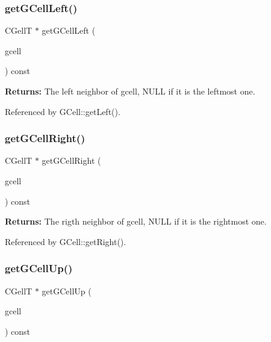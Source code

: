 \subsubsection{\texorpdfstring{get\+G\+Cell\+Left()}{getGCellLeft()}}
{\footnotesize\ttfamily C\+GellT $\ast$ get\+G\+Cell\+Left (\begin{DoxyParamCaption}\item[{const G\+CellT $\ast$}]{gcell }\end{DoxyParamCaption}) const\hspace{0.3cm}{\ttfamily [inline]}}

{\bfseries Returns\+:} The left neighbor of {\ttfamily gcell}, {\ttfamily N\+U\+LL} if it is the leftmost one. 

Referenced by G\+Cell\+::get\+Left().

\mbox{\label{classKatabatic_1_1Grid_a0e9bba0feb437dca932d59703298358e}} 
\subsubsection{\texorpdfstring{get\+G\+Cell\+Right()}{getGCellRight()}}
{\footnotesize\ttfamily C\+GellT $\ast$ get\+G\+Cell\+Right (\begin{DoxyParamCaption}\item[{const G\+CellT $\ast$}]{gcell }\end{DoxyParamCaption}) const\hspace{0.3cm}{\ttfamily [inline]}}

{\bfseries Returns\+:} The rigth neighbor of {\ttfamily gcell}, {\ttfamily N\+U\+LL} if it is the rightmost one. 

Referenced by G\+Cell\+::get\+Right().

\mbox{\label{classKatabatic_1_1Grid_a3a22f2bce9124765eb937b78c90059a0}} 
\subsubsection{\texorpdfstring{get\+G\+Cell\+Up()}{getGCellUp()}}
{\footnotesize\ttfamily C\+GellT $\ast$ get\+G\+Cell\+Up (\begin{DoxyParamCaption}\item[{const G\+CellT $\ast$}]{gcell }\end{DoxyParamCaption}) const\hspace{0.3cm}{\ttfamily [inline]}}

